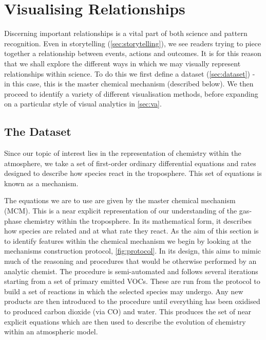 \section{Visualising Relationships}\label{sec:visrel}

Discerning important relationships is a vital part of both science and pattern recognition. Even in storytelling (\autoref{sec:storytelling}), we see readers trying to piece together a relationship between events, actions and outcomes. It is for this reason that we shall explore the different ways in which we may visually represent relationships within science. To do this we first define a dataset (\autoref{sec:dataset}) - in this case, this is the master chemical mechanism (described below). We then proceed to identify a variety of different visualisation methods, before expanding on a particular style of visual analytics in \autoref{sec:va}.

\subsection{The Dataset}\label{sec:dataset}
Since our topic of interest lies in the representation of chemistry within the atmosphere, we take a set of first-order ordinary differential equations and rates designed to describe
how species react in the troposphere. This set of equations is known as a mechanism.

The equations we are to use are given by the master chemical mechanism (MCM). This is a near explicit representation of our understanding of the gas-phase chemistry within the troposphere. In its mathematical form, it describes how species are related and at what rate they react. As the aim of this section is to identify features within the chemical mechanism we begin by looking at the mechanisms construction protocol, \autoref{fig:protocol}. In its design, this aims to mimic much of the reasoning and procedures that would be otherwise performed by an analytic chemist. The procedure is semi-automated and follows several iterations starting from a set of primary emitted VOCs. These are run from the protocol to build a set of reactions in which the selected species may undergo. Any new products are then introduced to the procedure until everything has been oxidised to produced carbon dioxide (via CO) and water. This produces the set of near explicit equations which are then used to describe the evolution of chemistry within an atmospheric model.

